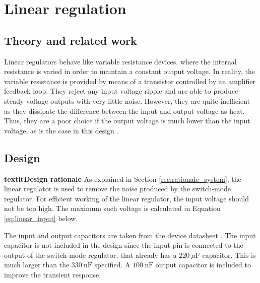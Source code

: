\chapter{Linear regulation}
\section{Theory and related work} \label{sec:literature_linear}
Linear regulators behave like variable resistance devices, where the internal resistance is varied in order to maintain a constant output voltage. In reality, the variable resistance is provided by means of a transistor controlled by an amplifier feedback loop. They reject any input voltage ripple and are able to produce steady voltage outputs with very little noise. However, they are quite inefficient as they dissipate the difference between the input and output voltage as heat. Thus, they are a poor choice if the output voltage is much lower than the input voltage, as is the case in this design \cite{regulators-main}.


\section{Design} \label{sec:design_linear}
\textbf{textit{Design rationale}}
As explained in Section \ref{sec:rationale_system}, the linear regulator is used to remove the noise produced by the switch-mode regulator. For efficient working of the linear regulator, the input voltage should not be too high. The maximum such voltage is calculated in Equation \ref{eq:linear_input} below.

The input and output capacitors are taken from the device datasheet \cite{LM7805}. The input capacitor is not included in the design since the input pin is connected to the output of the switch-mode regulator, that already has a $\SI{220}{\mu\farad}$ capacitor. This is much larger than the $\SI{330}{\nano\farad}$ specified. A $\SI{100}{\nano\farad}$ output capacitor is included to improve the transient response.


